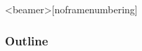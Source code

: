 \documentclass[10 pt]{beamer}
\begin{document}
%


\begin{frame}<beamer>[noframenumbering]
     \frametitle{Outline}
     \tableofcontents
\end{frame}







\setcounter{tocdepth}{4}
\end{document}
